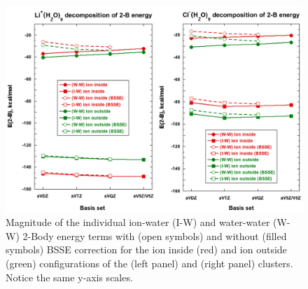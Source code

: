 \begin{figure}[t]
\uwsinglespace
\begin{center}
\includegraphics[width=\textwidth]{Figures/Chapter_3/figure_3_combined.png}
\end{center}
\begin{spacing}{1.0}
\caption[Magnitude of the individual ion-water (I-W) and water-water (W-W) 2-Body energy terms with (open symbols) and without (filled symbols) BSSE correction for the ion inside (red) and ion outside (green) configurations of the  (left panel) and  (right panel) clusters. Notice the same y-axis scales.]{Magnitude of the individual ion-water (I-W) and water-water (W-W) 2-Body energy terms with (open symbols) and without (filled symbols) BSSE correction for the ion inside (red) and ion outside (green) configurations of the  (left panel) and  (right panel) clusters. Notice the same y-axis scales.}\label{fig:MBE_II_3}
\end{spacing}
\end{figure}
